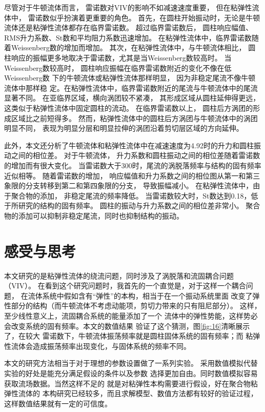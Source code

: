 \documentclass[UTF8,zihao=5]{ctexart} %
\begin{document}
尽管对于牛顿流体而言，
雷诺数对VIV的影响不如减速速度重要，
但在粘弹性流体中，
雷诺数似乎扮演着更重要的角色。
首先，在圆柱开始振动时，无论是牛顿流体还是粘弹性流体都存在临界雷诺数。
超过临界雷诺数后，
圆柱响应幅值、RMS升力系数、St数和平均阻力系数迅速增加。
在粘弹性流体中，临界雷诺数随着Weissenberg数的增加而增加。
其次，在粘弹性流体中，与牛顿流体相比，
圆柱响应的振幅更多地取决于雷诺数，尤其是当Weissenberg数较高时。
当Weissenberg数较高时，
圆柱响应振幅在临界雷诺数附近的变化不像在低Weissenberg数
下的牛顿流体或粘弹性流体那样明显，
因为非稳定尾流不像牛顿流体中那样稳
定。在粘弹性流体中，临界雷诺数附近的尾流与牛顿流体中的尾流显著不同。
在亚临界区域，横向涡团较不紧凑，
其形成区域从圆柱延伸得更远，这类似于粘弹性流体中固定圆柱的流动。
在临界雷诺数以上，
圆柱后方涡团的形成区域比之前短得多。
然而，粘弹性流体中的圆柱后方涡团与牛顿流体中的涡团明显不同，
表现为明显分层和明显拉伸的涡团沿着剪切层区域的方向延伸。

此外，本文还分析了牛顿流体和粘弹性流体中在减速速度为4.92时的升力和圆柱振动之间的相位差。
对于牛顿流体，
升力系数和圆柱振动之间的相位差随着雷诺数的增加而有很大变化。
当雷诺数大于300时，尾流的涡脱落频率与结构的固有频率近似相等。
随着雷诺数的增加，
响应幅值和升力系数之间的相位图从第一和第三象限的分支转移到第二和第四象限的分支，
导致振幅减小。
在粘弹性流体中，由于聚合物的添加，
非稳定尾流的频率降低。
当雷诺数较大时，St数达到0.18，低于所研究的结构的固有频率。
圆柱的振动与升力系数之间的相位差非常小。
聚合物的添加可以抑制非稳定尾流，同时也抑制结构的振动。

\section{感受与思考}

本文研究的是粘弹性流体的绕流问题，同时涉及了涡脱落和流固耦合问题（VIV）。
在看到这个研究问题时，我首先的一个直觉是，对于这样一个耦合问题，
在流体系统中假如含有“弹性”的本构，相当于在一个振动系统里面
改变了弹性部分的结构（而牛顿流体不考虑动能项，剪切力带来的只有阻尼部分）。
这样，至少线性意义上，流固耦合系统的能量添加了一个
流体中的弹性势能，这样势必会改变系统的固有频率。本文的数值结果
验证了这个猜测，图\ref{fig:16}清晰展示了，在较大
雷诺数下，牛顿流体振荡频率就是圆柱固体系统的固有频率；而
粘弹性流体会造成振荡频率出现变化，与固体系统的频率不同。

本文的研究方法相当于对于理想的参数设置做了一系列实验。
采用数值模拟代替实验的好处是能充分满足假设的条件以及参数
选择更加自由。同时数值模拟容易获取流场数据。当然这样不足的
就是对粘弹性本构需要进行假设，好在聚合物粘弹性流体的
本构研究已经较多，而且求解模型、数值方法都有较好的验证过程，
这样数值结果就有一定的可信度。
\end{document}
